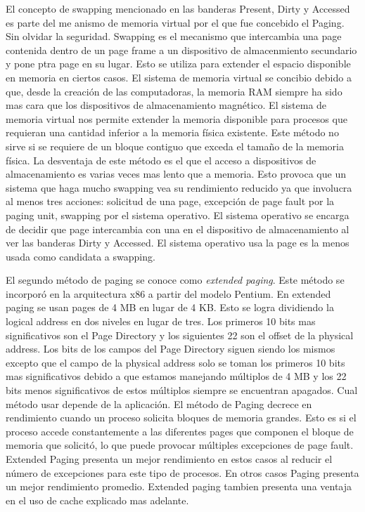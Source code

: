 El concepto de swapping mencionado en las banderas Present, Dirty y Accessed es
parte del me anismo de memoria virtual por el que fue concebido el Paging. Sin
olvidar la seguridad. Swapping es el mecanismo que intercambia una page
contenida dentro de un page frame a un dispositivo de almacenmiento secundario
y pone ptra page en su lugar. Esto se utiliza para extender el espacio
disponible en memoria en ciertos casos. El sistema de memoria virtual se
concibio debido a que, desde la creación de las computadoras, la memoria RAM
siempre ha sido mas cara que los dispositivos de almacenamiento magnético. El
sistema de memoria virtual nos permite extender la memoria disponible para
procesos que requieran una cantidad inferior a la memoria física
existente. Este método no sirve si se requiere de un bloque contiguo que exceda
el tamaño de la memoria física. La desventaja de este método es el que el
acceso a dispositivos de almacenamiento es varias veces mas lento que a
memoria. Esto provoca que un sistema que haga mucho swapping vea su rendimiento
reducido ya que involucra al menos tres acciones: solicitud de una page,
excepción de page fault por la paging unit, swapping por el sistema
operativo. El sistema operativo se encarga de decidir que page intercambia con
una en el dispositivo de almacenamiento al ver las banderas Dirty y
Accessed. El sistema operativo usa la page es la menos usada como candidata a
swapping.

El segundo método de paging se conoce como \emph{extended paging}. Este método
se incorporó en la arquitectura x86 a partir del modelo Pentium. En extended
paging se usan pages de 4 MB en lugar de 4 KB. Esto se logra dividiendo la
logical address en dos niveles en lugar de tres. Los primeros 10 bits mas
significativos son el Page Directory y los siguientes 22 son el offset de la
physical address. Los bits de los campos del Page Directory siguen siendo los
mismos excepto que el campo de la physical address solo se toman los primeros
10 bits mas significativos debido a que estamos manejando múltiplos de 4 MB y
los 22 bits menos significativos de estos múltiplos siempre se encuentran
apagados. Cual método usar depende de la aplicación. El método de Paging
decrece en rendimiento cuando un proceso solicita bloques de memoria
grandes. Esto es si el proceso accede constantemente a las diferentes pages que
componen el bloque de memoria que solicitó, lo que puede provocar múltiples
excepciones de page fault. Extended Paging presenta un mejor rendimiento en
estos casos al reducir el número de excepciones para este tipo de procesos. En
otros casos Paging presenta un mejor rendimiento promedio. Extended paging
tambien presenta una ventaja en el uso de cache explicado mas adelante.

